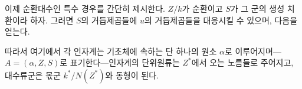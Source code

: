
이제 순환대수인 특수 경우를 간단히 제시한다. \(Z/k\)가 순환이고 \(S\)가 그 군의 생성 치환이라 하자. 그러면 \(S\)의 거듭제곱들에 \(u\)의 거듭제곱들을 대응시킬 수 있으며, 다음을 얻는다.


따라서 여기에서 각 인자계는 기초체에 속하는 단 하나의 원소 \(\alpha\)로 이루어지며---\(A=(\alpha,Z,S)\)로 표기한다---인자계의 단위원류는 \(Z^*\)에서 오는 노름들로 주어지고, 대수류군은 몫군 \(k^*/N(Z^*)\)와 동형이 된다.
